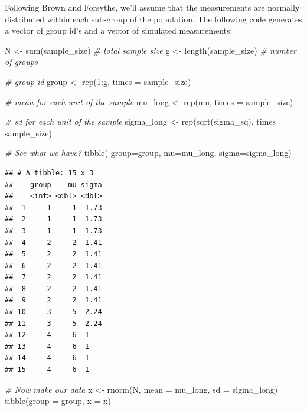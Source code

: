 \documentclass[
]{book}
\newenvironment{Shaded}{\begin{snugshade}}{\end{snugshade}}
\newcommand{\AttributeTok}[1]{\textcolor[rgb]{0.77,0.63,0.00}{#1}}
\newcommand{\CommentTok}[1]{\textcolor[rgb]{0.56,0.35,0.01}{\textit{#1}}}
\newcommand{\DecValTok}[1]{\textcolor[rgb]{0.00,0.00,0.81}{#1}}
\newcommand{\FunctionTok}[1]{\textcolor[rgb]{0.00,0.00,0.00}{#1}}
\newcommand{\NormalTok}[1]{#1}
\newcommand{\OtherTok}[1]{\textcolor[rgb]{0.56,0.35,0.01}{#1}}
\newcommand{\SpecialCharTok}[1]{\textcolor[rgb]{0.00,0.00,0.00}{#1}}
\begin{document}
Following Brown and Forsythe, we'll assume that the measurements are normally distributed within each sub-group of the population. The following code generates a vector of group id's and a vector of simulated measurements:

\begin{Shaded}
\begin{Highlighting}[]
\NormalTok{N }\OtherTok{\textless{}{-}} \FunctionTok{sum}\NormalTok{(sample\_size) }\CommentTok{\# total sample size}
\NormalTok{g }\OtherTok{\textless{}{-}} \FunctionTok{length}\NormalTok{(sample\_size) }\CommentTok{\# number of groups}

\CommentTok{\# group id}
\NormalTok{group }\OtherTok{\textless{}{-}} \FunctionTok{rep}\NormalTok{(}\DecValTok{1}\SpecialCharTok{:}\NormalTok{g, }\AttributeTok{times =}\NormalTok{ sample\_size)}

\CommentTok{\# mean for each unit of the sample}
\NormalTok{mu\_long }\OtherTok{\textless{}{-}} \FunctionTok{rep}\NormalTok{(mu, }\AttributeTok{times =}\NormalTok{ sample\_size) }

\CommentTok{\# sd for each unit of the sample}
\NormalTok{sigma\_long }\OtherTok{\textless{}{-}} \FunctionTok{rep}\NormalTok{(}\FunctionTok{sqrt}\NormalTok{(sigma\_sq), }\AttributeTok{times =}\NormalTok{ sample\_size) }

\CommentTok{\# See what we have?}
\FunctionTok{tibble}\NormalTok{( }\AttributeTok{group=}\NormalTok{group, }\AttributeTok{mu=}\NormalTok{mu\_long, }\AttributeTok{sigma=}\NormalTok{sigma\_long)}
\end{Highlighting}
\end{Shaded}

\begin{verbatim}
## # A tibble: 15 x 3
##    group    mu sigma
##    <int> <dbl> <dbl>
##  1     1     1  1.73
##  2     1     1  1.73
##  3     1     1  1.73
##  4     2     2  1.41
##  5     2     2  1.41
##  6     2     2  1.41
##  7     2     2  1.41
##  8     2     2  1.41
##  9     2     2  1.41
## 10     3     5  2.24
## 11     3     5  2.24
## 12     4     6  1   
## 13     4     6  1   
## 14     4     6  1   
## 15     4     6  1
\end{verbatim}

\begin{Shaded}
\begin{Highlighting}[]
\CommentTok{\# Now make our data}
\NormalTok{x }\OtherTok{\textless{}{-}} \FunctionTok{rnorm}\NormalTok{(N, }\AttributeTok{mean =}\NormalTok{ mu\_long, }\AttributeTok{sd =}\NormalTok{ sigma\_long)}
\FunctionTok{tibble}\NormalTok{(}\AttributeTok{group =}\NormalTok{ group, }\AttributeTok{x =}\NormalTok{ x)}
\end{Highlighting}
\end{Shaded}
\end{document}
